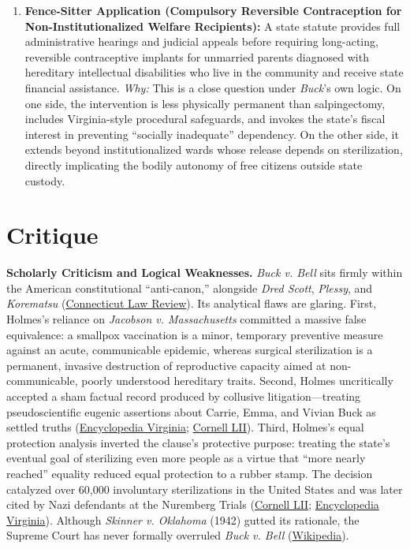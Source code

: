 \documentclass[12pt]{article}
\begin{document}
\begin{enumerate}
  \item \textbf{Fence-Sitter Application (Compulsory Reversible Contraception for Non-Institutionalized Welfare Recipients):} A state statute provides full administrative hearings and judicial appeals before requiring long-acting, reversible contraceptive implants for unmarried parents diagnosed with hereditary intellectual disabilities who live in the community and receive state financial assistance. \textit{Why:} This is a close question under \textit{Buck}'s own logic. On one side, the intervention is less physically permanent than salpingectomy, includes Virginia-style procedural safeguards, and invokes the state's fiscal interest in preventing ``socially inadequate'' dependency. On the other side, it extends beyond institutionalized wards whose release depends on sterilization, directly implicating the bodily autonomy of free citizens outside state custody.
\end{enumerate}

\section{Critique}

\textbf{Scholarly Criticism and Logical Weaknesses.} \textit{Buck v. Bell} sits firmly within the American constitutional ``anti-canon,'' alongside \textit{Dred Scott}, \textit{Plessy}, and \textit{Korematsu} (\href{https://digitalcommons.lib.uconn.edu/cgi/viewcontent.cgi?article=1495&context=law_review}{Connecticut Law Review}). Its analytical flaws are glaring. First, Holmes's reliance on \textit{Jacobson v. Massachusetts} committed a massive false equivalence: a smallpox vaccination is a minor, temporary preventive measure against an acute, communicable epidemic, whereas surgical sterilization is a permanent, invasive destruction of reproductive capacity aimed at non-communicable, poorly understood hereditary traits. Second, Holmes uncritically accepted a sham factual record produced by collusive litigation---treating pseudoscientific eugenic assertions about Carrie, Emma, and Vivian Buck as settled truths (\href{https://encyclopediavirginia.org/entries/buck-v-bell-1927/}{Encyclopedia Virginia}; \href{https://www.law.cornell.edu/supremecourt/text/18-483}{Cornell LII}). Third, Holmes's equal protection analysis inverted the clause's protective purpose: treating the state's eventual goal of sterilizing even more people as a virtue that ``more nearly reached'' equality reduced equal protection to a rubber stamp. The decision catalyzed over 60,000 involuntary sterilizations in the United States and was later cited by Nazi defendants at the Nuremberg Trials (\href{https://www.law.cornell.edu/supremecourt/text/18-483}{Cornell LII}; \href{https://encyclopediavirginia.org/entries/buck-v-bell-1927/}{Encyclopedia Virginia}). Although \textit{Skinner v. Oklahoma} (1942) gutted its rationale, the Supreme Court has never formally overruled \textit{Buck v. Bell} (\href{https://en.wikipedia.org/wiki/Buck_v._Bell}{Wikipedia}).
\end{document}
